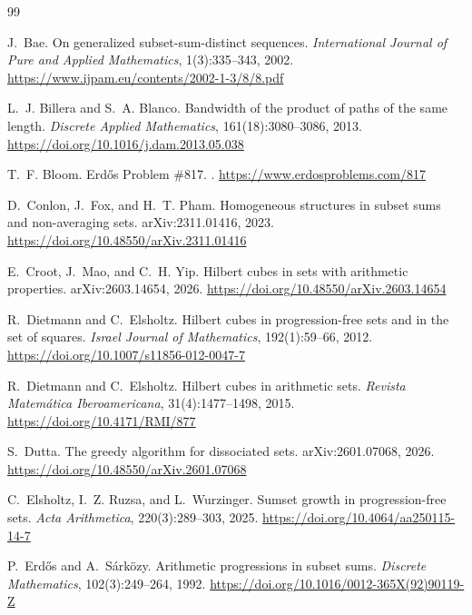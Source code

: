 \documentclass[11pt]{article}
\numberwithin{equation}{section}
\theoremstyle{definition}
\theoremstyle{remark}
\begin{document}
\begin{thebibliography}{99}

J.~Bae.
\newblock On generalized subset-sum-distinct sequences.
\newblock \emph{International Journal of Pure and Applied Mathematics}, 1(3):335--343, 2002.
\newblock \url{https://www.ijpam.eu/contents/2002-1-3/8/8.pdf}

L.~J. Billera and S.~A. Blanco.
\newblock Bandwidth of the product of paths of the same length.
\newblock \emph{Discrete Applied Mathematics}, 161(18):3080--3086, 2013.
\newblock \url{https://doi.org/10.1016/j.dam.2013.05.038}

T.~F. Bloom.
\newblock Erd{\H{o}}s Problem \#817.
.
\newblock \url{https://www.erdosproblems.com/817}

D.~Conlon, J.~Fox, and H.~T. Pham.
\newblock Homogeneous structures in subset sums and non-averaging sets.
\newblock arXiv:2311.01416, 2023.
\newblock \url{https://doi.org/10.48550/arXiv.2311.01416}

E.~Croot, J.~Mao, and C.~H. Yip.
\newblock Hilbert cubes in sets with arithmetic properties.
\newblock arXiv:2603.14654, 2026.
\newblock \url{https://doi.org/10.48550/arXiv.2603.14654}

R.~Dietmann and C.~Elsholtz.
\newblock Hilbert cubes in progression-free sets and in the set of squares.
\newblock \emph{Israel Journal of Mathematics}, 192(1):59--66, 2012.
\newblock \url{https://doi.org/10.1007/s11856-012-0047-7}

R.~Dietmann and C.~Elsholtz.
\newblock Hilbert cubes in arithmetic sets.
\newblock \emph{Revista Matem{\'a}tica Iberoamericana}, 31(4):1477--1498, 2015.
\newblock \url{https://doi.org/10.4171/RMI/877}

S.~Dutta.
\newblock The greedy algorithm for dissociated sets.
\newblock arXiv:2601.07068, 2026.
\newblock \url{https://doi.org/10.48550/arXiv.2601.07068}

C.~Elsholtz, I.~Z. Ruzsa, and L.~Wurzinger.
\newblock Sumset growth in progression-free sets.
\newblock \emph{Acta Arithmetica}, 220(3):289--303, 2025.
\newblock \url{https://doi.org/10.4064/aa250115-14-7}

P.~Erd{\H{o}}s and A.~S{\'a}rk{\"o}zy.
\newblock Arithmetic progressions in subset sums.
\newblock \emph{Discrete Mathematics}, 102(3):249--264, 1992.
\newblock \url{https://doi.org/10.1016/0012-365X(92)90119-Z}


\end{thebibliography}
\end{document}
